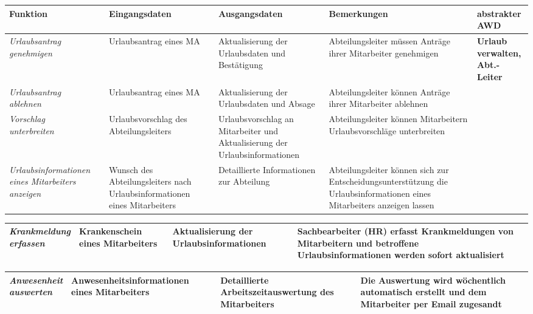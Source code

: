 {
\hspace{-3,5cm}
\footnotesize
\begin{tabular}{|p{3cm}|p{4cm}|p{4cm}|p{4cm}|p{2cm}|}
	\hline
		\textbf{Funktion	} &
		\textbf{Eingangsdaten} &
		\textbf{Ausgangsdaten}&
		\textbf{Bemerkungen}	&
		\textbf{abstrakter AWD} \\
	\hline \hline
		\textit{Urlaubsantrag \newline genehmigen} &
		Urlaubsantrag eines MA &
		Aktualisierung der Urlaubsdaten und Bestätigung &
		Abteilungsleiter müssen Anträge ihrer Mitarbeiter genehmigen &
		\textbf{Urlaub \newline verwalten, \newline Abt.-Leiter } \\
	\cline{1-4}
		\textit{Urlaubsantrag \newline ablehnen} &
		Urlaubsantrag eines MA &
		Aktualisierung der Urlaubsdaten und Absage&
		Abteilungsleiter können Anträge ihrer Mitarbeiter ablehnen &
		\\
	\cline{1-4}
		\textit{Vorschlag \newline unterbreiten} &
		Urlaubsvorschlag des Abteilungsleiters &
		Urlaubsvorschlag an Mitarbeiter und Aktualisierung der Urlaubsinformationen &
		Abteilungsleiter können Mitarbeitern Urlaubsvorschläge unterbreiten &
		\\
	\cline{1-4}
		\textit{Urlaubsinformationen eines Mitarbeiters an\-zeigen} &
		Wunsch des Abteilungsleiters nach Urlaubsinformationen eines Mitarbeiters &
		Detaillierte Informationen zur Abteilung &
		Abteilungsleiter können sich zur Entscheidungs\-unterstützung die Urlaubs\-informationen eines Mitarbeiters anzeigen lassen &
		\\
	\hline
\end{tabular}
}

{
\vspace{0,5cm}
\hspace{-3,5cm}
\footnotesize
\begin{tabular}{|p{3cm}|p{4cm}|p{4cm}|p{4cm}|p{2cm}|}
	\hline
		\textit{Krankmeldung \newline erfassen} &
		Krankenschein eines Mitarbeiters &
		Aktualisierung der Urlaubsinformationen &
		Sachbearbeiter (HR) erfasst Krankmeldungen von Mitarbeitern und betroffene Urlaubsinformationen werden sofort aktualisiert &
		 \\
	\hline
\end{tabular}
}

{
\vspace{0,5cm}
\hspace{-3,5cm}
\footnotesize
\begin{tabular}{|p{3cm}|p{4cm}|p{4cm}|p{4cm}|p{2cm}|}
	\hline
		\textit{Anwesenheit \newline auswerten} &
		Anwesenheitsinformationen eines Mitarbeiters &
		Detaillierte Arbeitszeit\-aus\-wertung des Mitarbeiters &
		Die Auswertung wird wöchentlich automatisch erstellt und dem Mitarbeiter per Email zugesandt &
		 \\
	\hline
\end{tabular}
}

